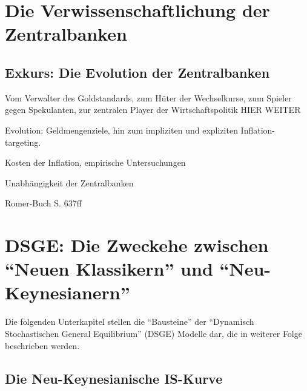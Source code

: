 \section{Die Verwissenschaftlichung der Zentralbanken}
\label{Taylor-Rule}

\subsection{Exkurs: Die Evolution der Zentralbanken}
Vom Verwalter des Goldstandards, zum Hüter der Wechselkurse, zum Spieler gegen Spekulanten, zur zentralen Player der Wirtschaftspolitik
HIER WEITER


Evolution: Geldmengenziele, hin zum impliziten und expliziten Inflation-targeting.

Kosten der Inflation, empirische Untersuchungen

Unabhängigkeit der Zentralbanken

Romer-Buch S. 637ff


\section{DSGE: Die Zweckehe zwischen "`Neuen Klassikern"' und "`Neu-Keynesianern"'}
Die folgenden Unterkapitel stellen die "`Bausteine"' der "`Dynamisch Stochastischen General Equilibrium"' (DSGE) Modelle dar, die in weiterer Folge beschrieben werden.


\subsection{Die Neu-Keynesianische IS-Kurve}


